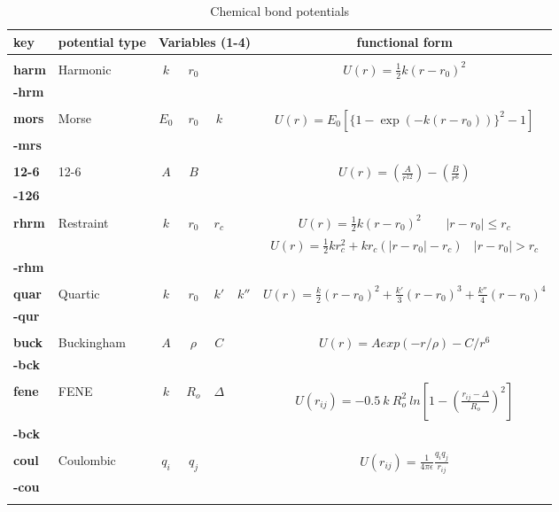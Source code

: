 \begin{enumerate}
\begin{table}[ht]
 \caption{\label{bondtable} Chemical bond potentials}     
\vskip 5pt
 \begin{centering}
 \begin{tabular}{|l|l|c|c|c|c|c|}
\hline
key & potential type &
\multicolumn{4}{c|}{Variables (1-4)} & functional form\\
\hline
 &  &  &  &  &  &  \\
{\bf harm} & Harmonic & $k$ & $r_{0}$ & & & $ U(r)=\frac{1}{2}k(r-r_{0})^2$ \\
{\bf -hrm} &  &  &  &  &  &  \\
 &  &  &  &  &  &  \\
{\bf mors} & Morse & $E_{0}$ & $r_{0}$ & $k$& &$U(r)=E_{0}[\{1-\exp(-k(r-r_{0}))\}^{2}-1]$\\ 
{\bf -mrs} &  &  &  &  & &  \\
 &  &  &  &  &  &  \\
{\bf 12-6} &12-6 & $A$ & $B$ &  &  & $U(r)=\left
(\frac{A}{r^{12}}\right)-\left(\frac{B}{r^{6}}\right)$\\
{\bf -126} &  &  &  &  &  &  \\
 &  &  &  &  &  &  \\
{\bf rhrm} & Restraint & $k$ &$r_{0}$ & $r_{c}$ & &
$U(r)=\frac{1}{2}k(r-r_{0})^2~~~~~~~~~|r-r_{0}|\le r_{c}$\\
  &  &  &  &  &  & $U(r)=\frac{1}{2}kr_{c}^2+kr_{c}(|r-r_{0}|-r_{c})~~~~|r-r_{0}|>r_{c}$\\
{\bf -rhm} &  &  &  &  &  &  \\
 &  &  &  &  &  &  \\
{\bf quar} & Quartic & $k$ & $r_{0}$ & $k'$ & $k''$ & $U(r)=\frac{k}{2}(r
-r_{0})^2+\frac{k'}{3}(r-r_{0})^3+\frac{k''}{4}(r-r_{0})^4$\\
{\bf -qur} &  &  &  &  &  &  \\
 &  &  &  &  &  &  \\
{\bf buck} & Buckingham & $A$ & $\rho$ & $C$  &  & $U(r)=Aexp(-r/\rho)-C/r^{6}$\\
{\bf -bck} &  &  &  &  &  &  \\
 &  &  &  &  &  &  \\
{\bf fene} & FENE & $k$ & $R_{o}$ & $\Delta$  &  & $U(r_{ij}) = 
-0.5~k~R_{o}^{2}~ln\left[1-\left(\frac{r_{ij}-\Delta}{R_{o}}\right)^{2}\right] $
\\
{\bf -bck} &  &  &  &  &  &  \\
 &  &  &  &  &  &  \\
{\bf coul} & Coulombic & $q_{i}$ & $q_{j}$  &  &  & $U(r_{ij}) = \frac{1}{4 \pi \epsilon}\frac{q_{i}q_{j}}{r_{ij}}$\\
{\bf -cou} &  &  &  &  &  &  \\
 &  &  &  &  &  &  \\
\hline
\end{tabular}


\end{centering}
\end{table}
\end{enumerate}
